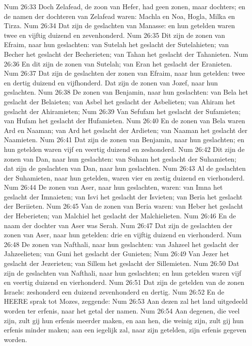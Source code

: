 Num 26:33  Doch Zelafead, de zoon van Hefer, had geen zonen, maar dochters; en de namen der dochteren van Zelafead waren: Machla en Noa, Hogla, Milka en Tirza.
Num 26:34  Dat zijn de geslachten van Manasse: en hun getelden waren twee en vijftig duizend en zevenhonderd.
Num 26:35  Dit zijn de zonen van Efraim, naar hun geslachten: van Sutelah het geslacht der Sutelahieten; van Becher het geslacht der Becherieten; van Tahan het geslacht der Tahanieten.
Num 26:36  En dit zijn de zonen van Sutelah; van Eran het geslacht der Eranieten.
Num 26:37  Dat zijn de geslachten der zonen van Efraim, naar hun getelden: twee en dertig duizend en vijfhonderd. Dat zijn de zonen van Jozef, naar hun geslachten.
Num 26:38  De zonen van Benjamin, naar hun geslachten: van Bela het geslacht der Belaieten; van Asbel het geslacht der Asbelieten; van Ahiram het geslacht der Ahiramieten;
Num 26:39  Van Sefufam het geslacht der Sufamieten; van Hufam het geslacht der Hufamieten.
Num 26:40  En de zonen van Bela waren Ard en Naaman; van Ard het geslacht der Ardieten; van Naaman het geslacht der Naamieten.
Num 26:41  Dat zijn de zonen van Benjamin, naar hun geslachten; en hun getelden waren vijf en veertig duizend en zeshonderd.
Num 26:42  Dit zijn de zonen van Dan, naar hun geslachten: van Suham het geslacht der Suhamieten; dat zijn de geslachten van Dan, naar hun geslachten.
Num 26:43  Al de geslachten der Suhamieten, naar hun getelden, waren vier en zestig duizend en vierhonderd.
Num 26:44  De zonen van Aser, naar hun geslachten, waren: van Imna het geslacht der Imnaieten; van Isvi het geslacht der Isvieten; van Beria het geslacht der Beriieten.
Num 26:45  Van de zonen van Beria waren: van Heber het geslacht der Heberieten; van Malchiel het geslacht der Malchielieten.
Num 26:46  En de naam der dochter van Aser was Serah.
Num 26:47  Dat zijn de geslachten der zonen van Aser, naar hun getelden: drie en vijftig duizend en vierhonderd.
Num 26:48  De zonen van Nafthali, naar hun geslachten: van Jahzeel het geslacht der Jahzeelieten; van Guni het geslacht der Gunieten;
Num 26:49  Van Jezer het geslacht der Jezerieten; van Sillem het geslacht der Sillemieten.
Num 26:50  Dat zijn de geslachten van Nafthali, naar hun geslachten; en hun getelden waren vijf en veertig duizend en vierhonderd.
Num 26:51  Dat zijn de getelden van de zonen Israels: zeshonderd een duizend zevenhonderd en dertig.
Num 26:52  En de HEERE sprak tot Mozes, zeggende:
Num 26:53  Aan dezen zal het land uitgedeeld worden ter erfenis, naar het getal der namen.
Num 26:54  Aan degenen, die veel zijn, zult gij hun erfenis meerder maken, en aan hen, die weinig zijn, zult gij hun erfenis minder maken; aan een iegelijk zal, naar zijn getelden, zijn erfenis gegeven worden.
